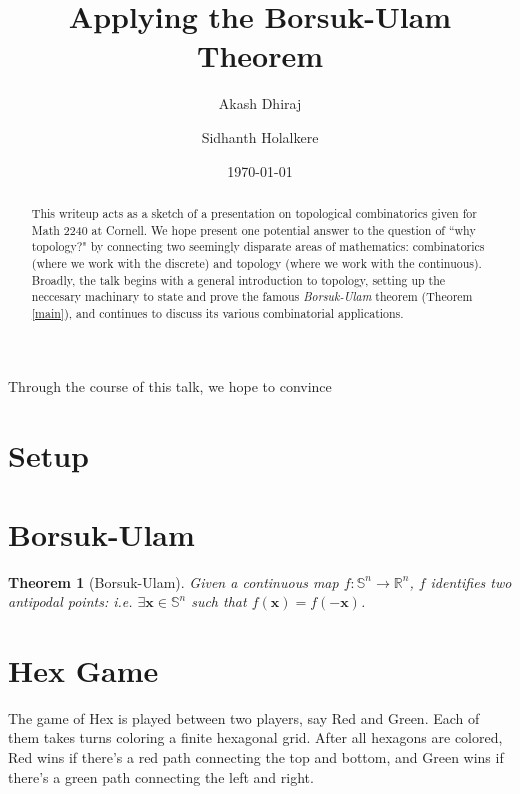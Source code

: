 \documentclass[12pt]{amsart}
\newtheorem{thm}{Theorem}[section]
\theoremstyle{definition}
\begin{document}
    \title{Applying the Borsuk-Ulam Theorem}
    \author{Akash Dhiraj}
    \author{Sidhanth Holalkere}
    \email{}
    \date{\today}

    \begin{abstract}
        This writeup acts as a sketch of a presentation on topological combinatorics given for Math 2240 at Cornell. We hope present one potential answer to the question of ``why topology?" by connecting two seemingly disparate areas of mathematics: combinatorics (where we work with the discrete) and topology (where we work with the continuous). Broadly, the talk begins with a general introduction to topology, setting up the neccesary machinary to state and prove the famous \emph{Borsuk-Ulam} theorem (Theorem \ref{main}), and continues to discuss its various combinatorial applications. 
    \end{abstract}

    \maketitle

    Through the course of this talk, we hope to convince 

    \section{Setup}

    \newpage

    \section{Borsuk-Ulam}

    \begin{thm}[Borsuk-Ulam]
        \label{main}
        Given a continuous map $f: \mathbb S^n \to \mathbb R^n$, $f$ identifies two antipodal points: i.e. $\exists \mathbf x \in \mathbb S^n$ such that $f(\mathbf x) = f(-\mathbf x)$.
    \end{thm}

    \newpage

    \section{Hex Game}

    The game of Hex is played between two players, say Red and Green. Each of them takes turns coloring a finite hexagonal grid. After all hexagons are colored, Red wins if there's a red path connecting the top and bottom, and Green wins if there's a green path connecting the left and right. 
\end{document}
